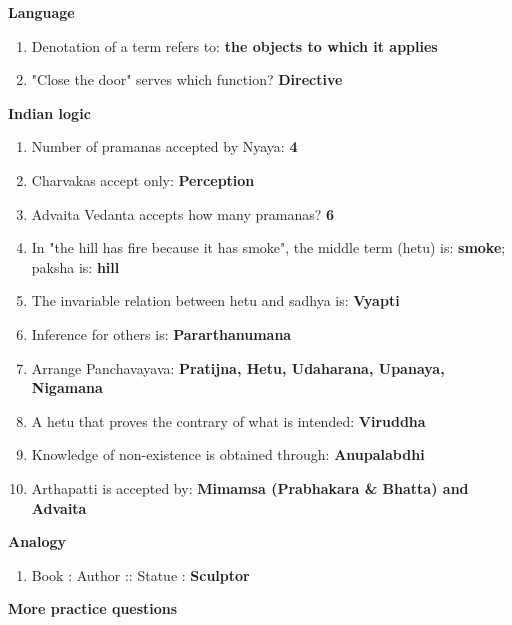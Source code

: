 \textbf{Language}

\begin{enumerate}
\def\labelenumi{\arabic{enumi}.}
\setcounter{enumi}{14}
\tightlist
\item
  Denotation of a term refers to: \textbf{the objects to which it applies}
\item
  "Close the door" serves which function? \textbf{Directive}
\end{enumerate}

\textbf{Indian logic}

\begin{enumerate}
\def\labelenumi{\arabic{enumi}.}
\setcounter{enumi}{16}
\tightlist
\item
  Number of pramanas accepted by Nyaya: \textbf{4}
\item
  Charvakas accept only: \textbf{Perception}
\item
  Advaita Vedanta accepts how many pramanas? \textbf{6}
\item
  In "the hill has fire because it has smoke", the middle term (hetu) is: \textbf{smoke}; paksha is: \textbf{hill}
\item
  The invariable relation between hetu and sadhya is: \textbf{Vyapti}
\item
  Inference for others is: \textbf{Pararthanumana}
\item
  Arrange Panchavayava: \textbf{Pratijna, Hetu, Udaharana, Upanaya, Nigamana}
\item
  A hetu that proves the contrary of what is intended: \textbf{Viruddha}
\item
  Knowledge of non-existence is obtained through: \textbf{Anupalabdhi}
\item
  Arthapatti is accepted by: \textbf{Mimamsa (Prabhakara \& Bhatta) and Advaita}
\end{enumerate}

\textbf{Analogy}

\begin{enumerate}
\def\labelenumi{\arabic{enumi}.}
\setcounter{enumi}{26}
\tightlist
\item
  Book : Author :: Statue : \textbf{Sculptor}
\end{enumerate}

\textbf{More practice questions}

